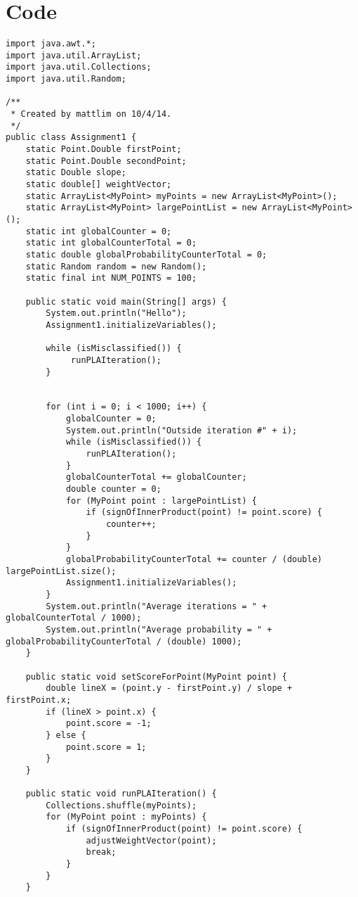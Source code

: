 \documentclass{article}
\begin{document}
\section*{Code}
\lstset{language=Java}
\begin{lstlisting}
import java.awt.*;
import java.util.ArrayList;
import java.util.Collections;
import java.util.Random;

/**
 * Created by mattlim on 10/4/14.
 */
public class Assignment1 {
    static Point.Double firstPoint;
    static Point.Double secondPoint;
    static Double slope;
    static double[] weightVector;
    static ArrayList<MyPoint> myPoints = new ArrayList<MyPoint>();
    static ArrayList<MyPoint> largePointList = new ArrayList<MyPoint>();
    static int globalCounter = 0;
    static int globalCounterTotal = 0;
    static double globalProbabilityCounterTotal = 0;
    static Random random = new Random();
    static final int NUM_POINTS = 100;

    public static void main(String[] args) {
        System.out.println("Hello");
        Assignment1.initializeVariables();

        while (isMisclassified()) {
             runPLAIteration();
        }


        for (int i = 0; i < 1000; i++) {
            globalCounter = 0;
            System.out.println("Outside iteration #" + i);
            while (isMisclassified()) {
                runPLAIteration();
            }
            globalCounterTotal += globalCounter;
            double counter = 0;
            for (MyPoint point : largePointList) {
                if (signOfInnerProduct(point) != point.score) {
                    counter++;
                }
            }
            globalProbabilityCounterTotal += counter / (double) largePointList.size();
            Assignment1.initializeVariables();
        }
        System.out.println("Average iterations = " + globalCounterTotal / 1000);
        System.out.println("Average probability = " + globalProbabilityCounterTotal / (double) 1000);
    }

    public static void setScoreForPoint(MyPoint point) {
        double lineX = (point.y - firstPoint.y) / slope + firstPoint.x;
        if (lineX > point.x) {
            point.score = -1;
        } else {
            point.score = 1;
        }
    }

    public static void runPLAIteration() {
        Collections.shuffle(myPoints);
        for (MyPoint point : myPoints) {
            if (signOfInnerProduct(point) != point.score) {
                adjustWeightVector(point);
                break;
            }
        }
    }


\end{lstlisting}
\end{document}
